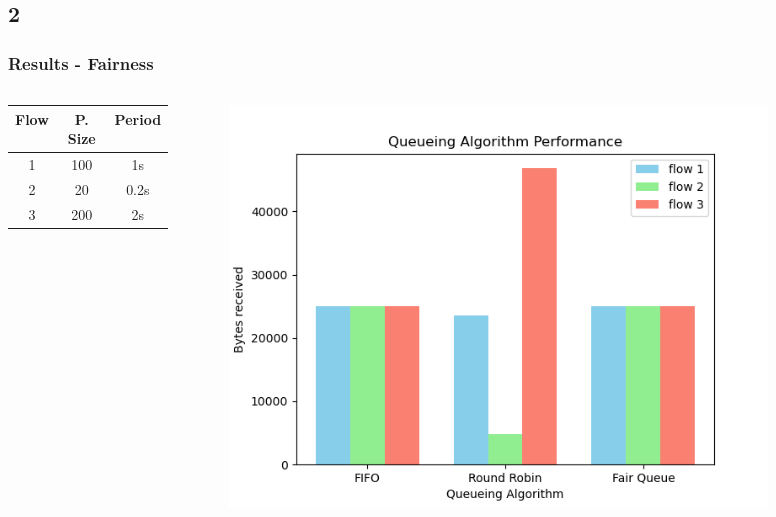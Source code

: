 \documentclass[compress]{beamer}
\begin{document}
    \subsection{2}
    \begin{frame}
        \frametitle{Results - Fairness}
        \begin{columns}
            \begin{column}{0.3\textwidth}
                \begin{tabular}{|c|c|c|}
                    \hline
                    Flow & P. Size & Period \\
                    \hline
                    1    & 100     & 1s     \\
                    2    & 20      & 0.2s   \\
                    3    & 200     & 2s     \\
                    \hline
                \end{tabular}
            \end{column}

            \begin{column}{0.7\textwidth}
                \begin{figure}
                    \centering
                    \includegraphics[width=0.9\textwidth]{../img/fairness_bar}
                \end{figure}
            \end{column}
        \end{columns}
    \end{frame}
\end{document}
